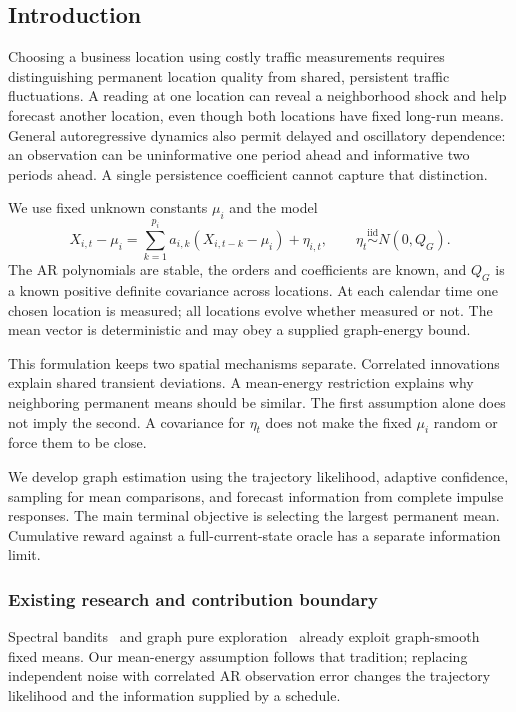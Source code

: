 \subsection{Introduction}
Choosing a business location using costly traffic measurements requires distinguishing permanent location quality from shared, persistent traffic fluctuations. A reading at one location can reveal a neighborhood shock and help forecast another location, even though both locations have fixed long-run means. General autoregressive dynamics also permit delayed and oscillatory dependence: an observation can be uninformative one period ahead and informative two periods ahead. A single persistence coefficient cannot capture that distinction.

We use fixed unknown constants $\mu_i$ and the model
\begin{equation}
\boxed{X_{i,t}-\mu_i
=\sum_{k=1}^{p_i}a_{i,k}(X_{i,t-k}-\mu_i)+\eta_{i,t},
\qquad \eta_t\stackrel{\mathrm{iid}}{\sim}N(0,Q_G).}
\label{spatiotemporal_bandits:eq:model}
\end{equation}
The AR polynomials are stable, the orders and coefficients are known, and $Q_G$ is a known positive definite covariance across locations. At each calendar time one chosen location is measured; all locations evolve whether measured or not. The mean vector is deterministic and may obey a supplied graph-energy bound.

This formulation keeps two spatial mechanisms separate. Correlated innovations explain shared transient deviations. A mean-energy restriction explains why neighboring permanent means should be similar. The first assumption alone does not imply the second. A covariance for $\eta_t$ does not make the fixed $\mu_i$ random or force them to be close.

We develop graph estimation using the trajectory likelihood, adaptive confidence, sampling for mean comparisons, and forecast information from complete impulse responses. The main terminal objective is selecting the largest permanent mean. Cumulative reward against a full-current-state oracle has a separate information limit.

\subsubsection{Existing research and contribution boundary}
Spectral bandits~\cite{collected1} and graph pure exploration~\cite{collected2} already exploit graph-smooth fixed means. Our mean-energy assumption follows that tradition; replacing independent noise with correlated AR observation error changes the trajectory likelihood and the information supplied by a schedule.

